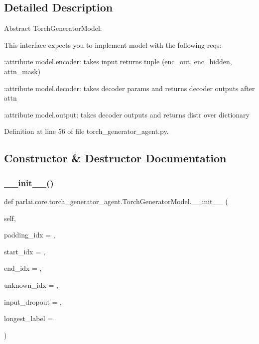 \subsection{Detailed Description}
\begin{DoxyVerb}Abstract TorchGeneratorModel.

This interface expects you to implement model with the following reqs:

:attribute model.encoder:
    takes input returns tuple (enc_out, enc_hidden, attn_mask)

:attribute model.decoder:
    takes decoder params and returns decoder outputs after attn

:attribute model.output:
    takes decoder outputs and returns distr over dictionary
\end{DoxyVerb}
 

Definition at line 56 of file torch\+\_\+generator\+\_\+agent.\+py.



\subsection{Constructor \& Destructor Documentation}
\mbox{\label{classparlai_1_1core_1_1torch__generator__agent_1_1TorchGeneratorModel_aaec943d5add4e6d90fdd451f740be6af}} 
\subsubsection{\texorpdfstring{\+\_\+\+\_\+init\+\_\+\+\_\+()}{\_\_init\_\_()}}
{\footnotesize\ttfamily def parlai.\+core.\+torch\+\_\+generator\+\_\+agent.\+Torch\+Generator\+Model.\+\_\+\+\_\+init\+\_\+\+\_\+ (\begin{DoxyParamCaption}\item[{}]{self,  }\item[{}]{padding\+\_\+idx = {},  }\item[{}]{start\+\_\+idx = {},  }\item[{}]{end\+\_\+idx = {},  }\item[{}]{unknown\+\_\+idx = {},  }\item[{}]{input\+\_\+dropout = {},  }\item[{}]{longest\+\_\+label = {} }\end{DoxyParamCaption})}



